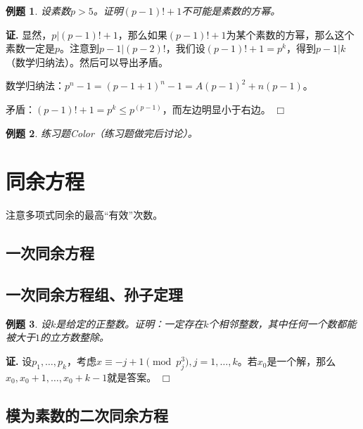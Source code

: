 \documentclass{ctexart}
\newtheorem{exmp}{例题}[section]
\renewenvironment{proof}[1][证]{\noindent \textbf{#1.} }{\hfill$\Box$}
\begin{document}
\begin{exmp}
设素数$p>5$。证明$(p-1)!+1$不可能是素数的方幂。
\end{exmp}
\begin{proof}
显然，$p|(p-1)!+1$，那么如果$(p-1)!+1$为某个素数的方幂，那么这个素数一定是$p$。注意到$p-1|(p-2)!$，我们设$(p-1)!+1=p^k$，得到$p-1|k$（数学归纳法）。然后可以导出矛盾。

数学归纳法：$p^n-1=(p-1+1)^n-1=A(p-1)^2+n(p-1)$。

矛盾：$(p-1)!+1=p^k \leq p^(p-1)$，而左边明显小于右边。
\end{proof}

\begin{exmp}
练习题Color（练习题做完后讨论）。
\end{exmp}

\section{同余方程}
注意多项式同余的最高“有效”次数。

\subsection{一次同余方程}

\subsection{一次同余方程组、孙子定理}

\begin{exmp}
设$k$是给定的正整数。证明：一定存在$k$个相邻整数，其中任何一个数都能被大于$1$的立方数整除。
\end{exmp}
\begin{proof}
设$p_1,\dotsc,p_k$，考虑$x\equiv -j+1\pmod{p_j^3}, j=1,\dotsc,k$。若$x_0$是一个解，那么$x_0,x_0+1,\dotsc,x_0+k-1$就是答案。
\end{proof}

\subsection{模为素数的二次同余方程}
\end{document}
